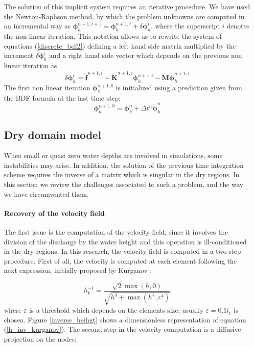 \documentclass[a4paper,12pt]{elsarticle}
\begin{document}
The solution of this implicit system requires an iterative procedure. We have used the Newton-Raphson method, by which the problem unknowns are computed in an incremental way as
$\bm{\phi}_h^{n+1,i+1} = \bm{\phi}_h^{n+1,i} + \delta\bm{\phi}_h^i$,
where the superscript $i$ denotes the non linear iteration.
This notation allows us to rewrite the system of equations (\ref{discrete_bdf2}) defining a left hand side matrix multiplied by the increment $\delta\bm{\phi}_h^i$ and a right hand side vector which depends on the previous non linear iteration as
\begin{equation}
[\beta_0\tilde{\mathbf{M}} + \tilde{\mathbf{K}}^{n+1,i}] \delta\bm{\phi}_h^i
= \tilde{\mathbf{f}}^{n+1,i} - \tilde{\mathbf{K}}^{n+1,i}\bm{\phi}_h^{n+1,i} - \tilde{\mathbf{M}}\dot{\bm{\phi}}_h^{n+1,i}
\end{equation}
The first non linear iteration $\bm{\phi}_h^{n+1,0}$ is initialized using a prediction given from the BDF formula at the last time step:
\begin{equation}
\bm{\phi}_h^{n+1,0} = \bm{\phi}_h^n + \Delta t^n \dot{\bm{\phi}}_h^{n}
\end{equation}


\subsection{Dry domain model}

When small or quasi zero water depths are involved in simulations, some instabilities may arise. In addition, the solution of the previous time integration scheme requires the inverse of a matrix which is singular in the dry regions. In this section we review the challenges associated to such a problem, and the way we have circumvented them.

\paragraph{Recovery of the velocity field}
The first issue is the computation of the velocity field, since it involves the division of the discharge by the water height and this operation is ill-conditioned in the dry regions. In this research, the velocity field is computed in a two step procedure. First of all, the velocity is computed at each element following the next expression, initially proposed by Kurganov \cite{kurganov2007}:

\begin{equation} \label{h_inv_kurganov}
h^{-1}_k = \frac{\sqrt{2}\max(h,0)}{\sqrt{h^4 + \max(h^4, \varepsilon^4)}}
\end{equation}
where $\varepsilon$ is a threshold which depends on the elements size; usually $\varepsilon = 0.1 l_e$ is chosen. Figure \ref{inverse_heihgt} shows a dimensionless representation of equation (\ref{h_inv_kurganov}). The second step in the velocity computation is a diffusive projection on the nodes:
\end{document}
